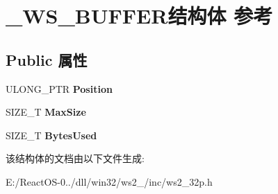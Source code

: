 \hypertarget{struct___w_s___b_u_f_f_e_r}{}\section{\+\_\+\+W\+S\+\_\+\+B\+U\+F\+F\+E\+R结构体 参考}
\label{struct___w_s___b_u_f_f_e_r}
\subsection*{Public 属性}
\begin{DoxyCompactItemize}
\item 
\mbox{\label{struct___w_s___b_u_f_f_e_r_ade00ca172ffa990fcecbb1c334b8f317}} 
U\+L\+O\+N\+G\+\_\+\+P\+TR {\bfseries Position}
\item 
\mbox{\label{struct___w_s___b_u_f_f_e_r_a3544ff6b2484152e1ddca33f52769c0d}} 
S\+I\+Z\+E\+\_\+T {\bfseries Max\+Size}
\item 
\mbox{\label{struct___w_s___b_u_f_f_e_r_a241a6ad789a49a452f516f56f03c5753}} 
S\+I\+Z\+E\+\_\+T {\bfseries Bytes\+Used}
\end{DoxyCompactItemize}


该结构体的文档由以下文件生成\+:\begin{DoxyCompactItemize}
\item 
E\+:/\+React\+O\+S-\/0../dll/win32/ws2\+\_/inc/ws2\+\_\+32p.\+h\end{DoxyCompactItemize}
